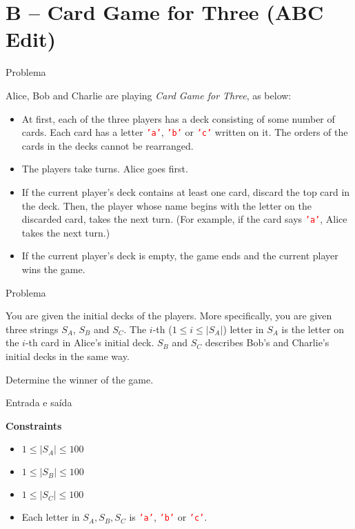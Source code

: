 \section{B -- Card Game for Three (ABC Edit)}

\begin{frame}[fragile]{Problema}

Alice, Bob and Charlie are playing \textit{Card Game for Three}, as below:

\begin{itemize}
    \item At first, each of the three players has a deck consisting of some number of cards. Each
        card has a letter \texttt{\textcolor{red}{'a'}}, \texttt{\textcolor{red}{'b'}} or
        \texttt{\textcolor{red}{'c'}} written on it. The orders of the cards in the decks cannot be
        rearranged.

    \item The players take turns. Alice goes first.

    \item If the current player's deck contains at least one card, discard the top card in the
        deck. Then, the player whose name begins with the letter on the discarded card, takes the
        next turn. (For example, if the card says \texttt{\textcolor{red}{'a'}}, Alice takes the
        next turn.)

    \item If the current player's deck is empty, the game ends and the current player wins the
        game. 
\end{itemize}

\end{frame}

\begin{frame}[fragile]{Problema}

You are given the initial decks of the players. More specifically, you are given three strings 
$S_A$, $S_B$ and $S_C$. The $i$-th ($1\leq i\leq |S_A|$) letter in $S_A$ is the letter on the 
$i$-th card in Alice's initial deck. $S_B$ and $S_C$ describes Bob's and Charlie's initial decks in
the same way.

Determine the winner of the game.

\end{frame}

\begin{frame}[fragile]{Entrada e saída}

\textbf{Constraints}

\begin{itemize}
    \item $1\leq |S_A| \leq 100$
    \item $1\leq |S_B| \leq 100$
    \item $1\leq |S_C| \leq 100$
    \item Each letter in $S_A, S_B, S_C$ is \texttt{\textcolor{red}{'a'}},
        \texttt{\textcolor{red}{'b'}} or \texttt{\textcolor{red}{'c'}}.
\end{itemize}

\end{frame}

